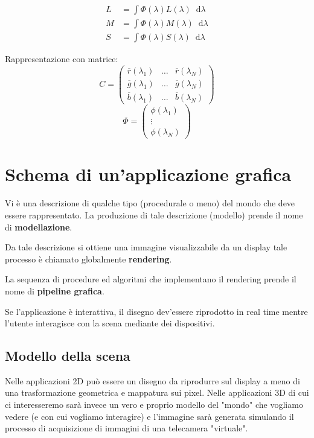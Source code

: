 \documentclass[a4paper, 10pt]{article}
\newcommand*\diff{\mathop{}\!\mathrm{d}}
\begin{document}
			\begin{align*}
				L &= \int \Phi (\lambda) L (\lambda) \diff\lambda \\
				M &= \int \Phi (\lambda) M (\lambda) \diff\lambda \\
				S &= \int \Phi (\lambda) S (\lambda) \diff\lambda 				
			\end{align*}
			
			Rappresentazione con matrice:
			\[
			C =
			\begin{pmatrix}
			\overline{r} (\lambda_1) & \dots & \overline{r}(\lambda_N) \\
			\overline{g} (\lambda_1) & \dots & \overline{g}(\lambda_N) \\
			\overline{b} (\lambda_1) & \dots & \overline{b}(\lambda_N) 
			\end{pmatrix}
			\]
			\[
			\Phi =
			\begin{pmatrix}
			\phi(\lambda_1)\\
			\vdots \\
			\phi (\lambda_N) 
			\end{pmatrix}
			\]
			
	\section{Schema di un'applicazione grafica}
		Vi è una descrizione di qualche tipo (procedurale o meno) del
		mondo che deve essere rappresentato. La produzione di tale
		descrizione (modello) prende il nome di \textbf{modellazione}.
		
		\noindent
		Da tale descrizione si ottiene una immagine visualizzabile da
		un display tale processo è chiamato globalmente \textbf{rendering}.
		
		\noindent
		La sequenza di procedure ed algoritmi che implementano il
		rendering prende il nome di \textbf{pipeline grafica}.
		
		\noindent
		Se l'applicazione è interattiva, il disegno dev'essere riprodotto
		in real time mentre l'utente interagisce con la scena mediante
		dei dispositivi.
			
	\subsection{Modello della scena}
		Nelle applicazioni 2D può essere un disegno da riprodurre sul
		display a meno di una trasformazione geometrica e mappatura
		sui pixel.
		Nelle applicazioni 3D di cui ci interesseremo sarà invece un
		vero e proprio modello del "mondo" che vogliamo vedere (e
		con cui vogliamo interagire) e l'immagine sarà generata
		simulando il processo di acquisizione di immagini di una
		telecamera "virtuale".
		
\end{document}
